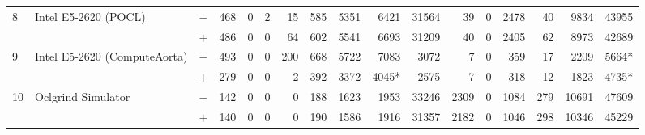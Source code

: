 \begin{tabular}{lll | rrrrrrr | rrrrrrr }
\hline
\multirow{ 2}{*}{8} & \multirow{ 2}{*}{Intel E5-2620 (POCL)} & $-$ & 468 & 0 & 2 & 15 & 585 & 5351 & 6421       & 31564 & 39 & 0 & 2478 & 40 & 9834 & 43955 \\& & $+$ & 486 & 0 & 0 & 64 & 602 & 5541 & 6693 & 31209 & 40 & 0 & 2405 & 62 & 8973 & 42689 \\
\hline
\multirow{ 2}{*}{9} & \multirow{ 2}{*}{Intel E5-2620 (ComputeAorta)} & $-$ & 493 & 0 & 0 & 200 & 668 & 5722 & 7083       & 3072 & 7 & 0 & 359 & 17 & 2209 & 5664* \\& & $+$ & 279 & 0 & 0 & 2 & 392 & 3372 & 4045* & 2575 & 7 & 0 & 318 & 12 & 1823 & 4735* \\
\hline
\multirow{ 2}{*}{10} & \multirow{ 2}{*}{Oclgrind Simulator} & $-$ & 142 & 0 & 0 & 0 & 188 & 1623 & 1953       & 33246 & 2309 & 0 & 1084 & 279 & 10691 & 47609 \\& & $+$ & 140 & 0 & 0 & 0 & 190 & 1586 & 1916 & 31357 & 2182 & 0 & 1046 & 298 & 10346 & 45229 \\
  \bottomrule
\end{tabular}

